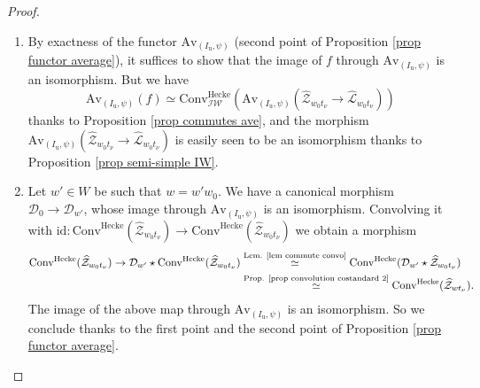 \documentclass[11pt]{amsart}
\theoremstyle{plain}
\theoremstyle{remark}
\numberwithin{equation}{section}
\begin{document}
 \begin{proof}
 \begin{enumerate}
			\item By exactness of the functor $\mathrm{Av}_{(I_\mathrm{u},\psi)}$ (second point of Proposition \ref{prop functor average}), it suffices to show that the image of $f$ through $\mathrm{Av}_{(I_\mathrm{u},\psi)}$ is an isomorphism. But we have
   $$\mathrm{Av}_{(I_\mathrm{u},\psi)}(f)\simeq \mathrm{Conv}^{\mathrm{Hecke}}_\mathcal{IW}(\mathrm{Av}_{(I_\mathrm{u},\psi)}(\widehat{\mathcal{Z}}_{w_0t_\nu}\to\widehat{\mathcal{L}}_{w_0t_\nu})) $$
   thanks to Proposition \ref{prop commutes ave}, and the morphism $\mathrm{Av}_{(I_\mathrm{u},\psi)}(\widehat{\mathcal{Z}}_{w_0t_\nu}\to\widehat{\mathcal{L}}_{w_0t_\nu})$ is easily seen to be an isomorphism thanks to Proposition \ref{prop semi-simple IW}.
			\item Let $w'\in W$ be such that $w=w'w_0$. We have a canonical morphism 
   $\mathcal{D}_0\to \mathcal{D}_{w'}$, whose image through $\mathrm{Av}_{(I_\mathrm{u},\psi)}$ is an isomorphism. Convolving it with $\mathrm{id}:\mathrm{Conv}^{\mathrm{Hecke}}(\widehat{\mathcal{Z}}_{w_0t_\nu})\to \mathrm{Conv}^{\mathrm{Hecke}}(\widehat{\mathcal{Z}}_{w_0t_\nu})$ we obtain a morphism
   \begin{align*}
       \mathrm{Conv}^{\mathrm{Hecke}}(\widehat{\mathcal{Z}}_{w_0t_\nu})\to \mathcal{D}_{w'}\star\mathrm{Conv}^{\mathrm{Hecke}}(\widehat{\mathcal{Z}}_{w_0t_\nu})&\overset{\text{Lem. \ref{lem commute convo}}}{\simeq} \mathrm{Conv}^{\mathrm{Hecke}}(\mathcal{D}_{w'}\star\widehat{\mathcal{Z}}_{w_0t_\nu})\\
       &\overset{\text{Prop. \ref{prop convolution costandard 2}}}{\simeq}\mathrm{Conv}^{\mathrm{Hecke}}(\widehat{\mathcal{Z}}_{wt_\nu}).
   \end{align*}
   The image of the above map through $\mathrm{Av}_{(I_\mathrm{u},\psi)}$ is an isomorphism. So we conclude thanks to the first point and the second point of Proposition \ref{prop functor average}.

\end{enumerate}
\end{proof}
\end{document}
